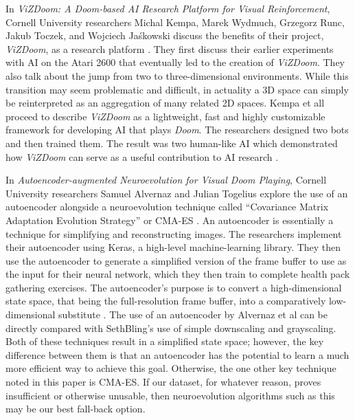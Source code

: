 In {\it ViZDoom: A Doom-based AI Research Platform for Visual Reinforcement}, Cornell University researchers Michal Kempa, Marek Wydmuch, Grzegorz Runc, Jakub Toczek, and Wojciech Jaśkowski discuss the benefits of their project, {\it ViZDoom}, as a research platform \cite{Kempka:2016}. They first discuss their earlier experiments with AI on the Atari 2600 that eventually led to the creation of {\it ViZDoom}. They also talk about the jump from two to three-dimensional environments. While this transition may seem problematic and difficult, in actuality a 3D space can simply be reinterpreted as an aggregation of many related 2D spaces. Kempa et all proceed to describe {\it ViZDoom} as a lightweight, fast and highly customizable framework for developing AI that plays {\it Doom}. The researchers designed two bots and then trained them. The result was two human-like AI which demonstrated how {\it ViZDoom} can serve as a useful contribution to AI research \cite{Kempka:2016}.

In {\it Autoencoder-augmented Neuroevolution for Visual Doom Playing}, Cornell University researchers Samuel Alvernaz and Julian Togelius explore the use of an autoencoder alongside a neuroevolution technique called ``Covariance Matrix Adaptation Evolution Strategy'' or CMA-ES \cite{Alvernaz:2017}. An autoencoder is essentially a technique for simplifying and reconstructing images. The researchers implement their autoencoder using Keras, a high-level machine-learning library. They then use the autoencoder to generate a simplified version of the frame buffer to use as the input for their neural network, which they then train to complete health pack gathering exercises. The autoencoder's purpose is to convert a high-dimensional state space, that being the full-resolution frame buffer, into a comparatively low-dimensional substitute \cite{Alvernaz:2017}. The use of an autoencoder by Alvernaz et al can be directly compared with SethBling's use of simple downscaling and grayscaling. Both of these techniques result in a simplified state space; however, the key difference between them is that an autoencoder has the potential to learn a much more efficient way to achieve this goal. Otherwise, the one other key technique noted in this paper is CMA-ES. If our dataset, for whatever reason, proves insufficient or otherwise unusable, then neuroevolution algorithms such as this may be our best fall-back option.




